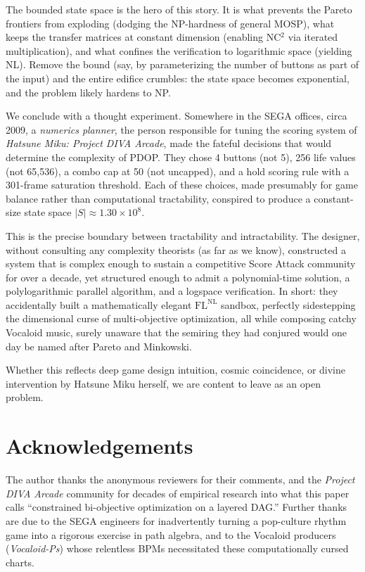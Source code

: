 \documentclass[11pt, letterpaper]{article}
\theoremstyle{definition}
\theoremstyle{remark}
\begin{document}
The bounded state space is the hero of this story.
It is what prevents the Pareto frontiers from exploding (dodging the NP-hardness of general MOSP), what keeps the transfer matrices at constant dimension (enabling NC$^2$ via iterated multiplication), and what confines the verification to logarithmic space (yielding NL).
Remove the bound (say, by parameterizing the number of buttons as part of the input) and the entire edifice crumbles: the state space becomes exponential, and the problem likely hardens to NP.

We conclude with a thought experiment.
Somewhere in the SEGA offices, circa 2009, a \textit{numerics planner}, the person responsible for tuning the scoring system of \textit{Hatsune Miku: Project DIVA Arcade}, made the fateful decisions that would determine the complexity of PDOP. They chose 4 buttons (not 5), 256 life values (not 65,536), a combo cap at 50 (not uncapped), and a hold scoring rule with a 301-frame saturation threshold. Each of these choices, made presumably for game balance rather than computational tractability, conspired to produce a constant-size state space $|S| \approx 1.30 \times 10^8$.

This is the precise boundary between tractability and intractability.
The designer, without consulting any complexity theorists (as far as we know), constructed a system that is complex enough to sustain a competitive Score Attack community for over a decade, yet structured enough to admit a polynomial-time solution, a polylogarithmic parallel algorithm, and a logspace verification.
In short: they accidentally built a mathematically elegant $\mathrm{FL}^{\mathrm{NL}}$ sandbox, perfectly sidestepping the dimensional curse of multi-objective optimization, all while composing catchy Vocaloid music, surely unaware that the semiring they had conjured would one day be named after Pareto and Minkowski.

Whether this reflects deep game design intuition, cosmic coincidence, or divine intervention by Hatsune Miku herself, we are content to leave as an open problem.

\section*{Acknowledgements}

The author thanks the anonymous reviewers for their comments, and the \textit{Project DIVA Arcade} community for decades of empirical research into what this paper calls ``constrained bi-objective optimization on a layered DAG.'' Further thanks are due to the SEGA engineers for inadvertently turning a pop-culture rhythm game into a rigorous exercise in path algebra, and to the Vocaloid producers (\textit{Vocaloid-Ps}) whose relentless BPMs necessitated these computationally cursed charts.
\end{document}
